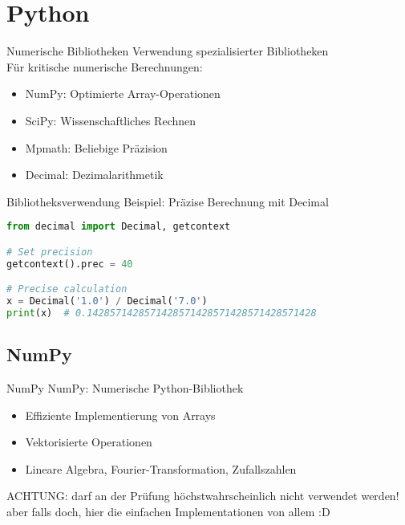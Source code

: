 
\section{Python}

\begin{remark2}{Numerische Bibliotheken} Verwendung spezialisierter Bibliotheken\\
Für kritische numerische Berechnungen:
\begin{itemize}
    \item NumPy: Optimierte Array-Operationen
    \item SciPy: Wissenschaftliches Rechnen
    \item Mpmath: Beliebige Präzision
    \item Decimal: Dezimalarithmetik
\end{itemize}
\end{remark2}

\begin{example2}{Bibliotheksverwendung} Beispiel: Präzise Berechnung mit Decimal
\begin{lstlisting}[language=Python, style=basesmol]
from decimal import Decimal, getcontext

# Set precision
getcontext().prec = 40

# Precise calculation
x = Decimal('1.0') / Decimal('7.0')
print(x)  # 0.1428571428571428571428571428571428571428
\end{lstlisting}
\end{example2}

\subsection{NumPy}

\begin{remark2}{NumPy} NumPy: Numerische Python-Bibliothek
\begin{itemize}
    \item Effiziente Implementierung von Arrays
    \item Vektorisierte Operationen
    \item Lineare Algebra, Fourier-Transformation, Zufallszahlen
\end{itemize} 
ACHTUNG: darf an der Prüfung höchstwahrscheinlich nicht verwendet werden!
aber falls doch, hier die einfachen Implementationen von allem :D
\end{remark2}

